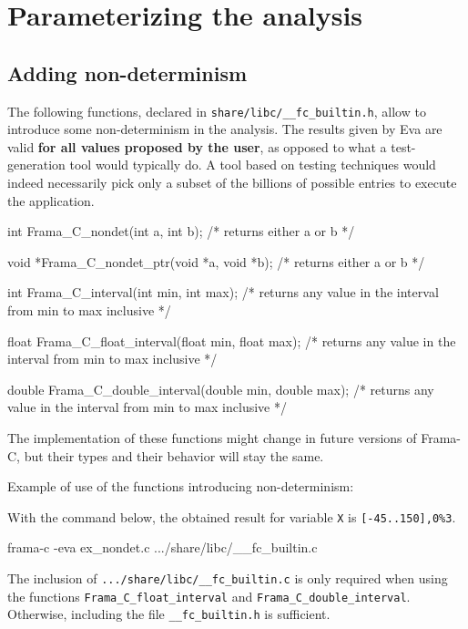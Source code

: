 \documentclass[web]{frama-c-book}
\newcommand{\Eva}{\textsf{Eva}}
\begin{document}
\section{Parameterizing the analysis}

\subsection{Adding non-determinism}
\label{nondeterminism}

The following functions, declared in \lstinline|share/libc/__fc_builtin.h|, allow to
introduce some non-determinism in the analysis. The results given by
\Eva{} are
valid \textbf{for all values proposed by the user}, as opposed
to what a test-generation tool would typically do. A tool based
on testing techniques
would indeed necessarily pick only a subset of the billions
 of possible entries
to execute the application.

\begin{listing-nonumber}
int Frama_C_nondet(int a, int b);
    /* returns either a or b */

void *Frama_C_nondet_ptr(void *a, void *b);
    /* returns either a or b */

int Frama_C_interval(int min, int max); 
    /* returns any value in the interval from min to max inclusive */

float Frama_C_float_interval(float min, float max);
    /* returns any value in the interval from min to max inclusive */

double Frama_C_double_interval(double min, double max);
    /* returns any value in the interval from min to max inclusive */
\end{listing-nonumber}

The implementation of these functions might change in future versions
of Frama-C, but their types and their behavior will stay the same.

Example of use of the functions introducing non-determinism:

With the command below, the obtained result for 
variable \lstinline|X| is \lstinline|[-45..150],0%3|.
\begin{shell}
frama-c -eva ex_nondet.c .../share/libc/__fc_builtin.c
\end{shell}
The inclusion of \lstinline|.../share/libc/__fc_builtin.c| is only required
when using the functions \lstinline|Frama_C_float_interval| and
\lstinline|Frama_C_double_interval|. Otherwise, including the file
\lstinline|__fc_builtin.h| is sufficient.
\end{document}
